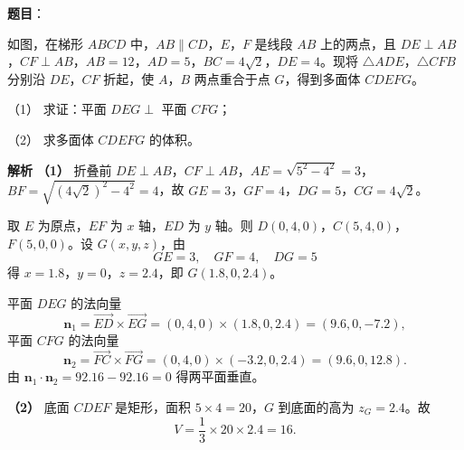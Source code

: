 \begin{answer}

\textbf{题目}：

如图，在梯形 $ABCD$ 中，$AB\parallel CD$，$E$，$F$ 是线段 $AB$ 上的两点，且 $DE\perp AB$，$CF\perp AB$，$AB=12$，$AD=5$，$BC=4\sqrt2$，$DE=4$。现将 $\triangle ADE$，$\triangle CFB$ 分别沿 $DE$，$CF$ 折起，使 $A$，$B$ 两点重合于点 $G$，得到多面体 $CDEFG$。

（1） 求证：平面 $DEG\perp$ 平面 $CFG$；

（2） 求多面体 $CDEFG$ 的体积。
\nopagebreak[4]
\begin{center}\end{center}
\nopagebreak[4]
\textbf{解析}
\textbf{（1）} 折叠前 $DE\perp AB$，$CF\perp AB$，$AE=\sqrt{5^2-4^2}=3$，$BF=\sqrt{(4\sqrt2)^2-4^2}=4$，故 $GE=3$，$GF=4$，$DG=5$，$CG=4\sqrt2$。

取 $E$ 为原点，$EF$ 为 $x$ 轴，$ED$ 为 $y$ 轴。则 $D(0,4,0)$，$C(5,4,0)$，$F(5,0,0)$。设 $G(x,y,z)$，由
\nopagebreak[4]
\[GE=3,\quad GF=4,\quad DG=5\]
得 $x=1.8$，$y=0$，$z=2.4$，即 $G(1.8,0,2.4)$。

平面 $DEG$ 的法向量
\nopagebreak[4]
\[\boldsymbol n_1=\overrightarrow{ED}\times\overrightarrow{EG}=(0,4,0)\times(1.8,0,2.4)=(9.6,0,-7.2),\]
平面 $CFG$ 的法向量
\nopagebreak[4]
\[\boldsymbol n_2=\overrightarrow{FC}\times\overrightarrow{FG}=(0,4,0)\times(-3.2,0,2.4)=(9.6,0,12.8).\]
由 $\boldsymbol n_1\cdot\boldsymbol n_2=92.16-92.16=0$ 得两平面垂直。

\textbf{（2）} 底面 $CDEF$ 是矩形，面积 $5\times4=20$，$G$ 到底面的高为 $z_G=2.4$。故
\nopagebreak[4]
\[V=\frac13\times20\times2.4=16.\]



\end{answer}
